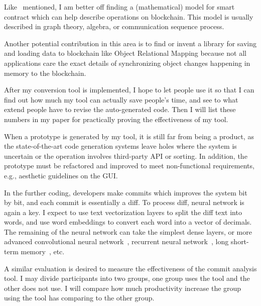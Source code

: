 Like~\cite{tolmach2021survey} mentioned, I am better off finding a (mathematical) model for smart contract which can help describe operations on blockchain. This model is usually described in graph theory, algebra, or communication sequence process.

Another potential contribution in this area is to find or invent a library for saving and loading data to blockchain like Object Relational Mapping because
not all applications care the exact details of synchronizing object changes happening in memory to the blockchain.


After my conversion tool is implemented, I hope to let people use it so that I can find out how much my tool can actually save people's time, and see to what extend people have to revise the auto-generated code. Then I will list these numbers in my paper for practically proving the effectiveness of my tool.

When a prototype is generated by my tool, it is still far from being a product, as the state-of-the-art code generation systems leave holes where the system is uncertain or the operation involves  third-party API or sorting. In addition, the prototype must be refactored and improved to meet non-functional requirements, e.g., aesthetic guidelines on the GUI.

In the further coding, developers make commits which improves the system bit by bit, and each commit is essentially a diff. To process diff, neural network is again a key. I expect to use text vectorization layers to split the diff text into words, and use word embeddings to convert each word into a vector of decimals.
The remaining of the neural network can take the simplest dense layers, or more advanced convolutional neural network~\cite{albawi2017understanding}, recurrent neural network~\cite{tarwani2017survey}, long short-term memory~\cite{skovajsova2017long}, etc.

A similar evaluation is desired to measure the effectiveness of the commit analysis tool. I may divide participants into two groups, one group uses the tool and the other does not use. I will compare how much productivity increase the group using the tool has comparing to the other group.


